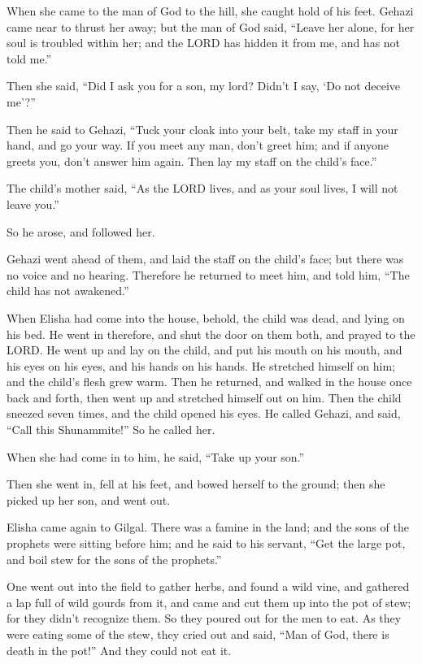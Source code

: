 \myverse{}When she came to the man of God to the hill, she caught hold
of his feet. Gehazi came near to thrust her away; but the man of God said, “Leave her alone, for her soul
is troubled within her; and the LORD has hidden it from me, and has not told me.”

\myverse{}Then she said, “Did I ask you for a son, my lord? Didn’t I say,
‘Do not deceive me’?”

\myverse{}Then he said to Gehazi, “Tuck your cloak into your belt, take
my staff in your hand, and go your way. If you meet any man, don’t greet him; and if anyone greets you,
don’t answer him again. Then lay my staff on the child’s face.”

\myverse{}The child’s mother said, “As the LORD lives, and as your soul
lives, I will not leave you.”

So he arose, and followed her.

\myverse{}Gehazi went ahead of them, and laid the staff on the child’s
face; but there was no voice and no hearing. Therefore he returned to meet him, and told him, “The child
has not awakened.”

\myverse{}When Elisha had come into the house, behold, the child was dead,
and lying on his bed.
\myverse{}He went in therefore, and shut the door on them both, and prayed to the LORD.
\myverse{}He went up and lay on the child, and put his mouth on his mouth, and his eyes
on his eyes, and his hands on his hands. He stretched himself on him; and the child’s flesh grew warm.
\myverse{}Then he returned, and walked in the house once back and forth, then went up
and stretched himself out on him. Then the child sneezed seven times, and the child opened his eyes.
\myverse{}He called Gehazi, and said, “Call this Shunammite!” So he called her.

When she had come in to him, he said, “Take up your son.”

\myverse{}Then she went in, fell at his feet, and bowed herself to the
ground; then she picked up her son, and went out.

\myverse{}Elisha came again to Gilgal. There was a famine in the land;
and the sons of the prophets were sitting before him; and he said to his servant, “Get the large pot,
and boil stew for the sons of the prophets.”

\myverse{}One went out into the field to gather herbs, and found a wild
vine, and gathered a lap full of wild gourds from it, and came and cut them up into the pot of stew; for
they didn’t recognize them.
\myverse{}So they poured out for the men to eat. As they were eating some of the stew,
they cried out and said, “Man of God, there is death in the pot!” And they could not eat it.

